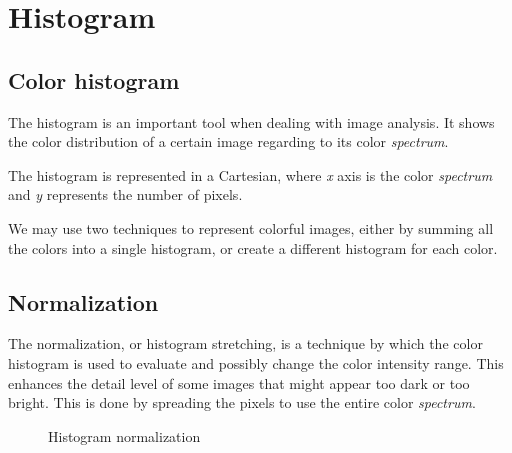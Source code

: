 \documentclass{article}
\begin{document}
	
\section{Histogram}

	\subsection{Color histogram}

		The histogram is an important tool when dealing with image analysis. It shows the color distribution of a certain image regarding to its 
		color \textit{spectrum}.
			
		The histogram is represented in a Cartesian, where \textit{x} axis is the 
		color \textit{spectrum} and \textit{y} represents the number of pixels.

		We may use two techniques
		to represent colorful images, either by summing all the colors into a single histogram, or create a different histogram for each color.
		

	\subsection{Normalization}
		
		The normalization, or histogram stretching, is a technique by which the color histogram is used to evaluate and possibly change
		the color intensity range. This enhances the detail level of some images that might appear too dark or too bright. This is done by spreading the pixels to use the entire color \textit{spectrum}.
		
		\begin{figure}[H]
		  \centering
		  \caption{Histogram normalization}
		  \label{fig:normalization}
		\end{figure}
\end{document}
